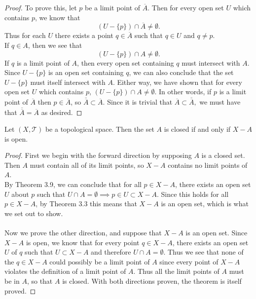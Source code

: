 \documentclass[letterpaper,12pt,twoside]{maths}
\begin{document}
\begin{proof}                    
    To prove this, let $p$ be a limit point of $\overline{A}$. Then
    for every open set $U$ which contains $p$, we know that 
    \[
        (U-\{p\})\cap \overline{A} \ne \emptyset.
    \] 
    Thus for each $U$ there exists a point $q \in
    \overline{A}$ such that $q \in U$ and $q \ne p$.
    \\
    If $q \in A$, then we see
    that 
    \[
        (U-\{p\}) \cap A \ne \emptyset.
    \] 
    If $q$ is a limit point of
    $A$, then every open set containing $q$ must intersect
    with $A$. Since $U- \{p\}$ is an open set containing $q$, we
    can also conclude that the set $U - \{p\}$ must
    itself intersect with $A$. Either way, we have shown that for
    every open set $U$ which contains $p$, $(U - \{p\}) \cap A \ne
    \emptyset$. In other words, if $p$ is a limit point of
    $\overline{A}$ then $p \in \overline{A}$, so
    $\overline{\overline{A}} \subset \overline{A}$.
    Since it is trivial that $\overline{A} \subset
    \overline{\overline{A}},$
    we must have that $\overline{\overline{A}} = \overline{A}$ 
    as desired.
\end{proof}


\begin{problem}[Theorem 3.14] Let $(X, \mathscr{T})$ be a topological
    space. Then the set $A$ is closed if and only if $X-A$ is open. 
\end{problem}

\begin{proof}
    First we begin with the forward direction by supposing $A$ is a
    closed set. Then $A$ must contain all of its limit points, so $X -
    A$ contains no limit points of $A$. \\By Theorem 3.9, we can
    conclude that for all $p \in X-A$, there exists an open set $U$
    about $p$ such that $U \cap A = \emptyset \implies p \in U 
    \subset X - A$. Since this holds for all $p \in X - A$,
    by Theorem 3.3 this means
    that $X - A$ is an open set, which is what we set out to show. \\
    \\
    Now we prove the other direction, and suppose that $X - A$ is an
    open set. Since
    $X - A$ is open, we know that for every point $q \in X - A$, there
    exists an open set $U$ of $q$ such that $U \subset X - A$ and
    therefore $U \cap A = \emptyset$. Thus we see that none of the $q
    \in X -A$ could possibly be a limit point of $A$ since every point
    of $X - A$ violates the definition of a limit point of $A$. 
    Thus all the limit
    points of $A$ must be in $A$, so that $A$ is closed. With both
    directions proven, the theorem is itself proved. 

\end{proof}
\end{document}
